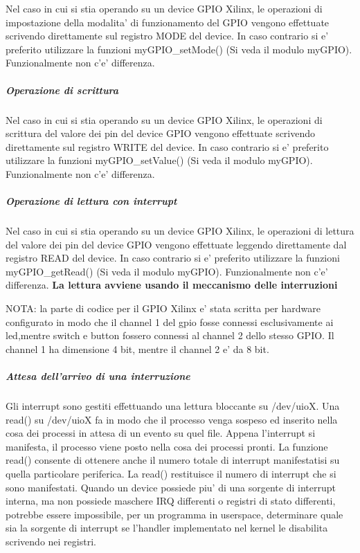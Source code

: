Nel caso in cui si stia operando su un device G\+P\+I\+O Xilinx, le operazioni di impostazione della modalita' di funzionamento del G\+P\+I\+O vengono effettuate scrivendo direttamente sul registro M\+O\+D\+E del device. In caso contrario si e' preferito utilizzare la funzioni my\+G\+P\+I\+O\+\_\+set\+Mode() (Si veda il modulo my\+G\+P\+I\+O). Funzionalmente non c'e' differenza.

\subparagraph*{Operazione di scrittura}

Nel caso in cui si stia operando su un device G\+P\+I\+O Xilinx, le operazioni di scrittura del valore dei pin del device G\+P\+I\+O vengono effettuate scrivendo direttamente sul registro W\+R\+I\+T\+E del device. In caso contrario si e' preferito utilizzare la funzioni my\+G\+P\+I\+O\+\_\+set\+Value() (Si veda il modulo my\+G\+P\+I\+O). Funzionalmente non c'e' differenza.

\subparagraph*{Operazione di lettura con interrupt}

Nel caso in cui si stia operando su un device G\+P\+I\+O Xilinx, le operazioni di lettura del valore dei pin del device G\+P\+I\+O vengono effettuate leggendo direttamente dal registro R\+E\+A\+D del device. In caso contrario si e' preferito utilizzare la funzioni my\+G\+P\+I\+O\+\_\+get\+Read() (Si veda il modulo my\+G\+P\+I\+O). Funzionalmente non c'e' differenza. {\bfseries La lettura avviene usando il meccanismo delle interruzioni}

N\+O\+T\+A\+: la parte di codice per il G\+P\+I\+O Xilinx e' stata scritta per hardware configurato in modo che il channel 1 del gpio fosse connessi esclusivamente ai led,mentre switch e button fossero connessi al channel 2 dello stesso G\+P\+I\+O. Il channel 1 ha dimensione 4 bit, mentre il channel 2 e' da 8 bit.

\subparagraph*{Attesa dell'arrivo di una interruzione}

Gli interrupt sono gestiti effettuando una lettura bloccante su /dev/uio\+X. Una read() su /dev/uio\+X fa in modo che il processo venga sospeso ed inserito nella cosa dei processi in attesa di un evento su quel file. Appena l'interrupt si manifesta, il processo viene posto nella cosa dei processi pronti. La funzione read() consente di ottenere anche il numero totale di interrupt manifestatisi su quella particolare periferica. La read() restituisce il numero di interrupt che si sono manifestati. Quando un device possiede piu' di una sorgente di interrupt interna, ma non possiede maschere I\+R\+Q differenti o registri di stato differenti, potrebbe essere impossibile, per un programma in userspace, determinare quale sia la sorgente di interrupt se l'handler implementato nel kernel le disabilita scrivendo nei registri.

